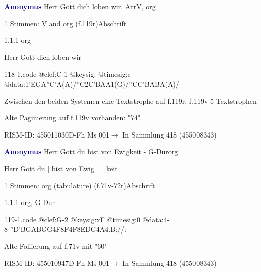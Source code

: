 \documentclass[twocolumn, 12pt]{book}
\begin{document}
\par \vspace{16pt} \textcolor{darkblue}{\textbf{Anonymus  }}\hfillplus{\textbf{[118]}}\newline Herr Gott dich loben wir. Arr\newline V, org
\par \begin{itshape}\end{itshape} 
\par \textcolor{darkblue}{}  1 Stimmen: V and org  (f.119r)\newline Abschrift
\par 1.1.1  org\newline \begin{footnotesize} Herr Gott dich loben wir \end{footnotesize}  
\begin{filecontents*}{118-1.code}
@clef:C-1
@keysig:
@timesig:c
@data:1'EGA''C'A(A)/''C2C'BAA1(G)/''CC'BABA(A)/
\end{filecontents*}
\newline %
\par Zwischen den beiden Systemen eine Textstrophe auf f.119r, f.119v 5 Textstrophen
\par Alte Paginierung auf f.119v vorhanden: "74"
\par RISM-ID: 455011030\newline D-Fh  Ms 001\newline $\rightarrow$ In Sammlung 418 (455008343)
      
\par \vspace{16pt} \textcolor{darkblue}{\textbf{Anonymus  }}\hfillplus{\textbf{[119]}}\newline Herr Gott du bist von Ewigkeit - G-Dur\newline org
\par \begin{itshape}[f.71v, at left:] Herr Gott du | bist von Ewig= | keit\end{itshape} 
\par \textcolor{darkblue}{}  1 Stimmen: org (tabulature)  (f.71v-72r)\newline Abschrift
\par 1.1.1  org, G-Dur  
\begin{filecontents*}{119-1.code}
@clef:G-2
@keysig:xF
@timesig:0
@data:4-8-''D{'BGAB}{GG}4F8F4F8E{DG}4A4.B://:
\end{filecontents*}
\newline %
\par Alte Foliierung auf f.71v mit "60"
\par RISM-ID: 455010947\newline D-Fh  Ms 001\newline $\rightarrow$ In Sammlung 418 (455008343)
      
\end{document}
